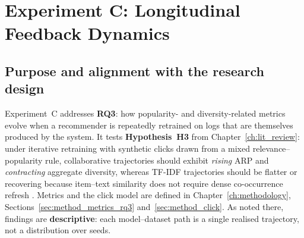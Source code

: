 \chapter{Experiment C: Longitudinal Feedback Dynamics}
\label{ch:exp_c}

\section{Purpose and alignment with the research design}
Experiment~C addresses \textbf{RQ3}: how popularity- and diversity-related metrics evolve when a recommender is repeatedly retrained on logs that are themselves produced by the system. It tests \textbf{Hypothesis~H3} from Chapter~\ref{ch:lit_review}: under iterative retraining with synthetic clicks drawn from a mixed relevance--popularity rule, collaborative trajectories should exhibit \emph{rising} ARP and \emph{contracting} aggregate diversity, whereas TF-IDF trajectories should be flatter or recovering because item--text similarity does not require dense co-occurrence refresh \citep{chaney2018algorithmic, mansoury2020feedback}. Metrics and the click model are defined in Chapter~\ref{ch:methodology}, Sections~\ref{sec:method_metrics_rq3} and~\ref{sec:method_click}. As noted there, findings are \textbf{descriptive}: each model--dataset path is a single realised trajectory, not a distribution over seeds.

